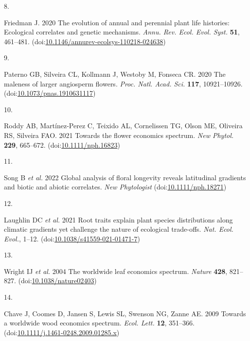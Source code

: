 \documentclass[
  12pt,
  a4paper,
]{article}
\newlength{\cslhangindent}
\newlength{\csllabelwidth}
\newlength{\cslentryspacingunit} %
\newenvironment{CSLReferences}[2] %
 {%
  \setlength{\parindent}{0pt}
  \ifodd #1
  \let\oldpar\par
  \def\par{\hangindent=\cslhangindent\oldpar}
  \fi
  \setlength{\parskip}{#2\cslentryspacingunit}
 }%
 {}
\newcommand{\CSLLeftMargin}[1]{\parbox[t]{\csllabelwidth}{#1}}
\newcommand{\CSLRightInline}[1]{\parbox[t]{\linewidth - \csllabelwidth}{#1}\break}
\begin{document}
\begin{CSLReferences}{0}{0}
\leavevmode{}%
\CSLLeftMargin{8. }
\CSLRightInline{Friedman J. 2020 The evolution of annual and perennial plant life histories: Ecological correlates and genetic mechanisms. \emph{Annu. Rev. Ecol. Evol. Syst.} \textbf{51}, 461--481. (doi:\href{https://doi.org/10.1146/annurev-ecolsys-110218-024638}{10.1146/annurev-ecolsys-110218-024638})}

\leavevmode{}%
\CSLLeftMargin{9. }
\CSLRightInline{Paterno GB, Silveira CL, Kollmann J, Westoby M, Fonseca CR. 2020 The maleness of larger angiosperm flowers. \emph{Proc. Natl. Acad. Sci.} \textbf{117}, 10921--10926. (doi:\href{https://doi.org/10.1073/pnas.1910631117}{10.1073/pnas.1910631117})}

\leavevmode{}%
\CSLLeftMargin{10. }
\CSLRightInline{Roddy AB, Martínez-Perez C, Teixido AL, Cornelissen TG, Olson ME, Oliveira RS, Silveira FAO. 2021 Towards the flower economics spectrum. \emph{New Phytol.} \textbf{229}, 665--672. (doi:\href{https://doi.org/10.1111/nph.16823}{10.1111/nph.16823})}

\leavevmode{}%
\CSLLeftMargin{11. }
\CSLRightInline{Song B \emph{et al.} 2022 Global analysis of floral longevity reveals latitudinal gradients and biotic and abiotic correlates. \emph{New Phytologist} (doi:\href{https://doi.org/10.1111/nph.18271}{10.1111/nph.18271})}

\leavevmode{}%
\CSLLeftMargin{12. }
\CSLRightInline{Laughlin DC \emph{et al.} 2021 Root traits explain plant species distributions along climatic gradients yet challenge the nature of ecological trade-offs. \emph{Nat. Ecol. Evol.}, 1--12. (doi:\href{https://doi.org/10.1038/s41559-021-01471-7}{10.1038/s41559-021-01471-7})}

\leavevmode{}%
\CSLLeftMargin{13. }
\CSLRightInline{Wright IJ \emph{et al.} 2004 The worldwide leaf economics spectrum. \emph{Nature} \textbf{428}, 821--827. (doi:\href{https://doi.org/10.1038/nature02403}{10.1038/nature02403})}

\leavevmode{}%
\CSLLeftMargin{14. }
\CSLRightInline{Chave J, Coomes D, Jansen S, Lewis SL, Swenson NG, Zanne AE. 2009 Towards a worldwide wood economics spectrum. \emph{Ecol. Lett.} \textbf{12}, 351--366. (doi:\href{https://doi.org/10.1111/j.1461-0248.2009.01285.x}{10.1111/j.1461-0248.2009.01285.x})}


\end{CSLReferences}
\end{document}

